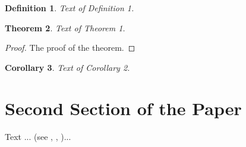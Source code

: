 \documentclass[12pt]{article}
\theoremstyle{theorem}
\newtheorem{theorem}{Theorem}
\newtheorem{corollary}[theorem]{Corollary}
\theoremstyle{defi}
\newtheorem{definition}[theorem]{Definition}
\begin{document}
\begin{definition}
Text of Definition 1.
\end{definition}

\begin{theorem}
Text of Theorem 1.
\end{theorem}

\begin{proof}
The proof of the theorem.
\end{proof}

\begin{corollary}
Text of Corollary 2.
\end{corollary}

\section{Second Section of the Paper}

Text ... (see \cite{gasrah}, \cite{rosbl}, \cite{Moak})...
\end{document}
